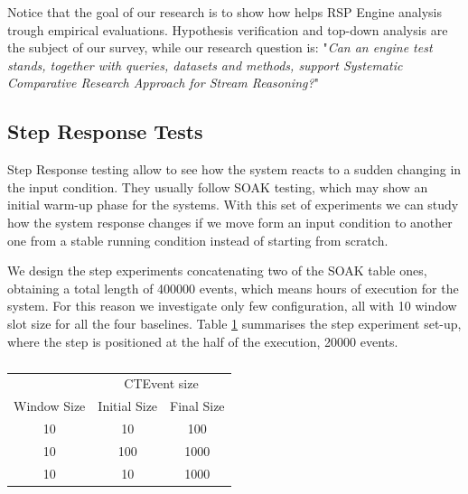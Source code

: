 Notice that the goal of our research is to show how \name helps RSP Engine analysis trough empirical evaluations. Hypothesis verification and top-down analysis are the subject of our survey, while our research question is:  "\textit{Can an engine test stands, together with queries, datasets and methods, support Systematic Comparative Research Approach for Stream Reasoning?}" %

\subsection{Step Response Tests}\label{sec:step-es}

Step Response testing allow to see how the system reacts to a sudden changing in the input condition. They usually follow SOAK testing, which may show an initial warm-up phase for the systems. With this set of experiments we can study how the system response changes if we move form an input condition to another one from a stable running condition instead of starting from scratch.

We design the step experiments concatenating two of the SOAK table ones, obtaining a total length of 400000 events, which means hours of execution for the system. For this reason we investigate only few configuration, all with 10  window slot size for all the four baselines. Table \ref{tab:steptests} summarises the step experiment set-up, where the step is positioned at the half of the execution, 20000 events.
\begin{table}[htb]
\centering
 \begin{tabular}{c|c|c}
	  	\hline
	  	&\multicolumn{2}{c}{CTEvent size}  \\
		Window Size & Initial Size & Final Size\\
		\hline
		\hline
		 10 & 10 & 100\\
		  10 & 100 & 1000\\
		 10 & 10 & 1000\\
		
		\hline 
 \end{tabular}
	\vspace{10pt}
 \caption{}
\label{tab:steptests}
\end{table}


